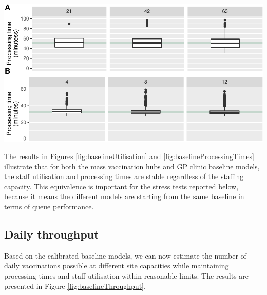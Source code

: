 \documentclass{article}
\let\origfigure\figure
\let\endorigfigure\endfigure
\renewenvironment{figure}[1][2] {
    \expandafter\origfigure\expandafter[H]
} {
    \endorigfigure
}
\begin{document}
\begin{figure}

{\centering \includegraphics{Preprint_files/figure-latex/baselineProcessingTimes-1} 

}

\caption{Baseline median processing times for the mass vaccination hub (A) and GP vaccination clinic (B)}\label{fig:baselineProcessingTimes}
\end{figure}

The results in Figures \ref{fig:baselineUtilisation} and
\ref{fig:baselineProcessingTimes} illustrate that for both the mass
vaccination hubs and GP clinic baseline models, the staff utilisation
and processing times are stable regardless of the staffing capacity.
This equivalence is important for the stress tests reported below,
because it means the different models are starting from the same
baseline in terms of queue performance.

\hypertarget{daily-throughput}{%
\subsection{Daily throughput}\label{daily-throughput}}

Based on the calibrated baseline models, we can now estimate the number
of daily vaccinations possible at different site capacities while
maintaining processing times and staff utilisation within reasonable
limits. The results are presented in Figure
\ref{fig:baselineThroughput}.
\end{document}
